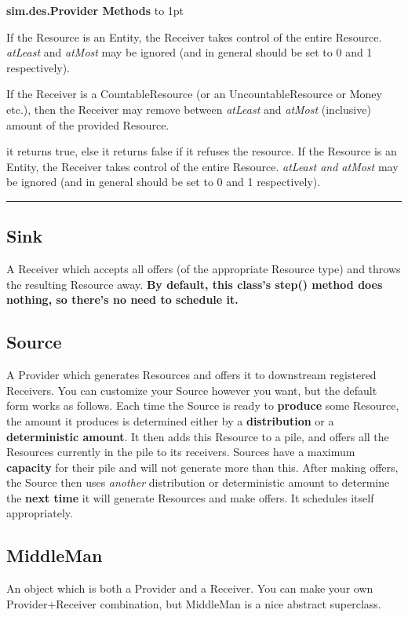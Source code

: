 \documentclass[twoside,10pt]{article}
\newcommand\class[1]{\index{Classes!{#1}}\textsf{#1}}
\newcommand*{\xfill}[1][0pt]{%
	\cleaders
		\hbox to 1pt{\hss
			\raisebox{#1}{\rule{1.2pt}{0.4pt}}%
			\hss}\hfill}
\newenvironment{methods}[1]{
\vspace{1.0em}\noindent\textsf{\textbf{#1 Methods}}\quad \xfill[0.5ex]
\vspace{-0.25em}
\begin{description}
\small}
{\end{description}\hrule\vspace{1.5em}}
\begin{document}
\begin{itemize}
\begin{methods}{\class{sim.des.Provider}}
If the Resource is an Entity, the Receiver takes control of the entire Resource.  {\it atLeast} and {\it atMost} may be ignored (and in general should be set to 0 and 1 respectively).

If the Receiver is a CountableResource (or an UncountableResource or Money etc.), then the Receiver may remove between {\it atLeast} and {\it atMost} (inclusive) amount of the provided Resource.

it returns true, else it returns false if it refuses the resource.   If the Resource is an Entity, the Receiver takes control of the entire Resource.  {\it atLeast and atMost} may be ignored (and in general should be set to 0 and 1 respectively).

\end{methods}




\subsection{Sink}

A Receiver which accepts all offers (of the appropriate Resource type) and throws the resulting Resource away.  {\bf By default, this class's step() method does nothing, so there's no need to schedule it.}

\subsection{Source}

A Provider which generates Resources and offers it to downstream registered Receivers.  You can customize your Source however you want, but the default form works as follows.  Each time the Source is ready to {\bf produce} some Resource, the amount it produces is determined either by a {\bf distribution} or a {\bf deterministic amount}.  It then adds this Resource to a pile, and offers all the Resources currently in the pile to its receivers.  Sources have a maximum {\bf capacity} for their pile and will not generate more than this.  After making offers, the Source then uses {\it another} distribution or deterministic amount to determine the {\bf next time} it will generate Resources and make offers.  It schedules itself appropriately.


\subsection{MiddleMan}

An object which is both a Provider and a Receiver.  You can make your own Provider+Receiver combination, but MiddleMan is a nice abstract superclass.  


\end{itemize}
\end{document}
